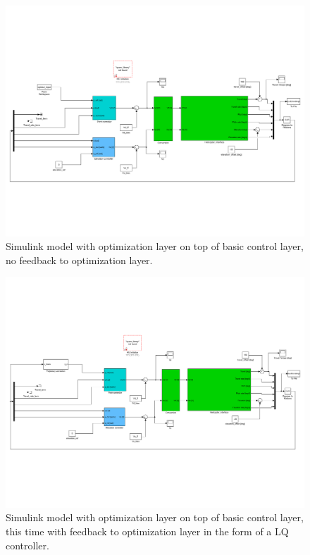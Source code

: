 \begin{figure}[!htb]
	\centering
	\includegraphics[trim=10 100 10 100, clip, width=\textwidth]{figures/simulink/ex2.pdf}
	\caption{Simulink model with optimization layer on top of basic control layer, no feedback to optimization layer.}
\label{fig:sim_ex2}
\end{figure}


\begin{figure}[!htb]
	\centering
	\includegraphics[trim=10 100 10 100, clip, width=\textwidth]{figures/simulink/ex3.pdf}
	\caption{Simulink model with optimization layer on top of basic control layer, this time with feedback to optimization layer in the form of a LQ controller.}
\label{fig:sim_ex3}
\end{figure}

